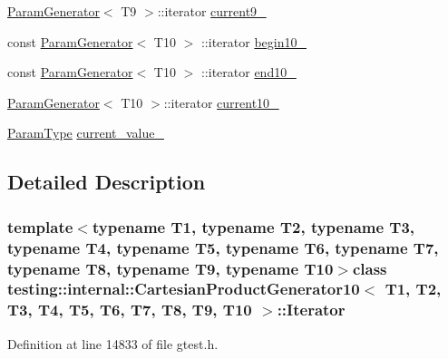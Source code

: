 \begin{DoxyCompactItemize}
\item 
\hyperlink{classtesting_1_1internal_1_1ParamGenerator}{\-Param\-Generator}$<$ \-T9 $>$\-::iterator \hyperlink{classtesting_1_1internal_1_1CartesianProductGenerator10_1_1Iterator_ac4b67d02258d0c531be8e55638871e6b}{current9\-\_\-}
\item 
const \hyperlink{classtesting_1_1internal_1_1ParamGenerator}{\-Param\-Generator}$<$ \-T10 $>$\*
\-::iterator \hyperlink{classtesting_1_1internal_1_1CartesianProductGenerator10_1_1Iterator_ac85af45c2ae098d57775d9f29fe34994}{begin10\-\_\-}
\item 
const \hyperlink{classtesting_1_1internal_1_1ParamGenerator}{\-Param\-Generator}$<$ \-T10 $>$\*
\-::iterator \hyperlink{classtesting_1_1internal_1_1CartesianProductGenerator10_1_1Iterator_a82038d343d1bab92a0ac6285d0ebf17f}{end10\-\_\-}
\item 
\hyperlink{classtesting_1_1internal_1_1ParamGenerator}{\-Param\-Generator}$<$ \-T10 $>$\-::iterator \hyperlink{classtesting_1_1internal_1_1CartesianProductGenerator10_1_1Iterator_a86f3effab9cb39553aa86235141f8269}{current10\-\_\-}
\item 
\hyperlink{classtesting_1_1internal_1_1CartesianProductGenerator10_adffde37eb66ea6d9917ab9fd24b46926}{\-Param\-Type} \hyperlink{classtesting_1_1internal_1_1CartesianProductGenerator10_1_1Iterator_a1b76a85d1482a16a96efc293e8384512}{current\-\_\-value\-\_\-}
\end{DoxyCompactItemize}


\subsection{\-Detailed \-Description}
\subsubsection*{template$<$typename T1, typename T2, typename T3, typename T4, typename T5, typename T6, typename T7, typename T8, typename T9, typename T10$>$class testing\-::internal\-::\-Cartesian\-Product\-Generator10$<$ T1, T2, T3, T4, T5, T6, T7, T8, T9, T10 $>$\-::\-Iterator}



\-Definition at line 14833 of file gtest.\-h.



